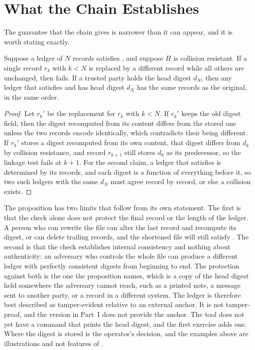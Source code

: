 \section{What the Chain Establishes}

The guarantee that the chain gives is narrower than it can appear, and it is worth stating exactly.

\begin{proposition}\label{prop:chain}
Suppose a ledger of $N$ records satisfies , and suppose $H$ is collision resistant. If a single record $r_k$ with $k < N$ is replaced by a different record while all others are unchanged, then  fails. If a trusted party holds the head digest $d_N$, then any ledger that satisfies  and has head digest $d_N$ has the same records as the original, in the same order.
\end{proposition}

\begin{proof}
Let $r_k'$ be the replacement for $r_k$ with $k<N$. If $r_k'$ keeps the old digest field, then the digest recomputed from its content differs from the stored one unless the two records encode identically, which contradicts their being different. If $r_k'$ stores a digest recomputed from its own content, that digest differs from $d_k$ by collision resistance, and record $r_{k+1}$ still stores $d_k$ as its predecessor, so the linkage test fails at $k+1$. For the second claim, a ledger that satisfies  is determined by its records, and each digest is a function of everything before it, so two such ledgers with the same $d_N$ must agree record by record, or else a collision exists.
\end{proof}

The proposition has two limits that follow from its own statement. The first is that the check alone does not protect the final record or the length of the ledger. A person who can rewrite the file can alter the last record and recompute its digest, or can delete trailing records, and the shortened file will still satisfy . The second is that the check establishes internal consistency and nothing about authenticity: an adversary who controls the whole file can produce a different ledger with perfectly consistent digests from beginning to end. The protection against both is the one the proposition names, which is a copy of the head digest held somewhere the adversary cannot reach, such as a printed note, a message sent to another party, or a record in a different system. The ledger is therefore best described as tamper-evident relative to an external anchor. It is not tamper-proof, and the version in Part~I does not provide the anchor. The tool does not yet have a command that prints the head digest, and the first exercise adds one. Where the digest is stored is the operator's decision, and the examples above are illustrations and not features of \golab{}.

